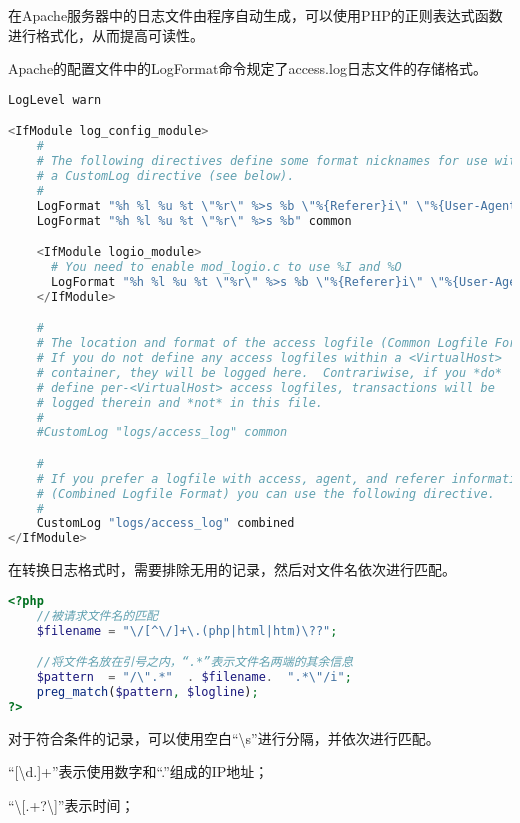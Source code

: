在Apache服务器中的日志文件由程序自动生成，可以使用PHP的正则表达式函数进行格式化，从而提高可读性。


Apache的配置文件中的LogFormat命令规定了access.log日志文件的存储格式。



\begin{lstlisting}[language=PHP]
LogLevel warn

<IfModule log_config_module>
    #
    # The following directives define some format nicknames for use with
    # a CustomLog directive (see below).
    #
    LogFormat "%h %l %u %t \"%r\" %>s %b \"%{Referer}i\" \"%{User-Agent}i\"" combined
    LogFormat "%h %l %u %t \"%r\" %>s %b" common

    <IfModule logio_module>
      # You need to enable mod_logio.c to use %I and %O
      LogFormat "%h %l %u %t \"%r\" %>s %b \"%{Referer}i\" \"%{User-Agent}i\" %I %O" combinedio
    </IfModule>

    #
    # The location and format of the access logfile (Common Logfile Format).
    # If you do not define any access logfiles within a <VirtualHost>
    # container, they will be logged here.  Contrariwise, if you *do*
    # define per-<VirtualHost> access logfiles, transactions will be
    # logged therein and *not* in this file.
    #
    #CustomLog "logs/access_log" common

    #
    # If you prefer a logfile with access, agent, and referer information
    # (Combined Logfile Format) you can use the following directive.
    #
    CustomLog "logs/access_log" combined
</IfModule>
\end{lstlisting}

在转换日志格式时，需要排除无用的记录，然后对文件名依次进行匹配。

\begin{lstlisting}[language=PHP]
<?php
	//被请求文件名的匹配
	$filename = "\/[^\/]+\.(php|html|htm)\??";

	//将文件名放在引号之内，“.*”表示文件名两端的其余信息
	$pattern  = "/\".*"  . $filename.  ".*\"/i";
	preg_match($pattern, $logline);
?>
\end{lstlisting}

对于符合条件的记录，可以使用空白“\textbackslash s”进行分隔，并依次进行匹配。

\begin{compactitem}
\item “[\textbackslash d.]+”表示使用数字和“.”组成的IP地址；
\item “\textbackslash [.+?\textbackslash ]”表示时间；
\end{compactitem}

